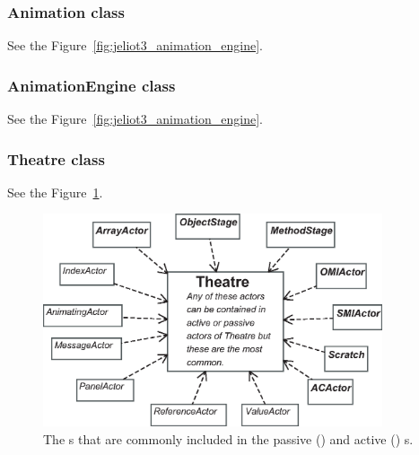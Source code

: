 \subsubsection{Animation class}

See the Figure~\ref{fig:jeliot3_animation_engine}.

\subsubsection{AnimationEngine class}

See the Figure~\ref{fig:jeliot3_animation_engine}.

\subsubsection{Theatre class}

See the Figure~\ref{fig:theatre_and_actorcontainers}.

\begin{figure}[!htb]
\begin{center}
\includegraphics[width=10cm]{images/theatre_and_actors.eps}
\caption{The s that are commonly included in the passive () and active () s.}
\label{fig:theatre_and_actorcontainers}
\end{center}
\end{figure}


